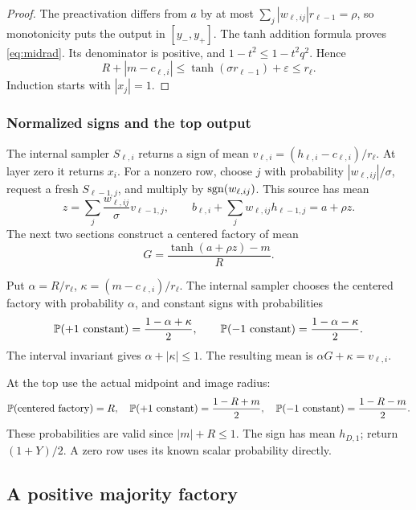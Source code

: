 \begin{proof}
The preactivation differs from \(a\) by at most
\(\sum_j|w_{\ell,ij}|r_{\ell-1}=\rho\), so monotonicity puts the
output in \([y_-,y_+]\). The tanh addition formula proves
\eqref{eq:midrad}. Its denominator is positive, and
\(1-t^2\le1-t^2q^2\). Hence
\[
R+|m-c_{\ell,i}|
\le\tanh(\sigma r_{\ell-1})+\varepsilon\le r_\ell.
\]
Induction starts with \(|x_j|=1\).
\end{proof}

\subsubsection{Normalized signs and the top output}

The internal sampler \(S_{\ell,i}\) returns a sign of mean
\(v_{\ell,i}=(h_{\ell,i}-c_{\ell,i})/r_\ell\).
At layer zero it returns \(x_i\).
For a nonzero row, choose \(j\) with probability
\(|w_{\ell,ij}|/\sigma\), request a fresh \(S_{\ell-1,j}\), and
multiply by \(\operatorname{sgn}(w_{\ell,ij})\).
This source has mean
\[
z=\sum_j\frac{w_{\ell,ij}}{\sigma}v_{\ell-1,j},\qquad
b_{\ell,i}+\sum_jw_{\ell,ij}h_{\ell-1,j}=a+\rho z.
\]
The next two sections construct a centered factory of mean
\begin{equation}\label{eq:centered}
G=\frac{\tanh(a+\rho z)-m}{R}.
\end{equation}

Put \(\alpha=R/r_\ell\), \(\kappa=(m-c_{\ell,i})/r_\ell\).
The internal sampler chooses the centered factory with probability
\(\alpha\), and constant signs with probabilities
\begin{equation}\label{eq:internalmixture}
\mathbb P(+1\hbox{ constant})=\frac{1-\alpha+\kappa}{2},\qquad
\mathbb P(-1\hbox{ constant})=\frac{1-\alpha-\kappa}{2}.
\end{equation}
The interval invariant gives \(\alpha+|\kappa|\le1\).
The resulting mean is \(\alpha G+\kappa=v_{\ell,i}\).

At the top use the actual midpoint and image radius:
\begin{equation}\label{eq:topmixture}
\mathbb P(\hbox{centered factory})=R,\quad
\mathbb P(+1\hbox{ constant})=\frac{1-R+m}{2},\quad
\mathbb P(-1\hbox{ constant})=\frac{1-R-m}{2}.
\end{equation}
These probabilities are valid since \(|m|+R\le1\).
The sign has mean \(h_{D,1}\); return \((1+Y)/2\).
A zero row uses its known scalar probability directly.

\subsection{A positive majority factory}\label{sec:majority}

